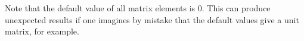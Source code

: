 Note that the default value of all matrix elements is 0. This can produce unexpected results if one imagines by mistake that the default values give a unit matrix, for example.
